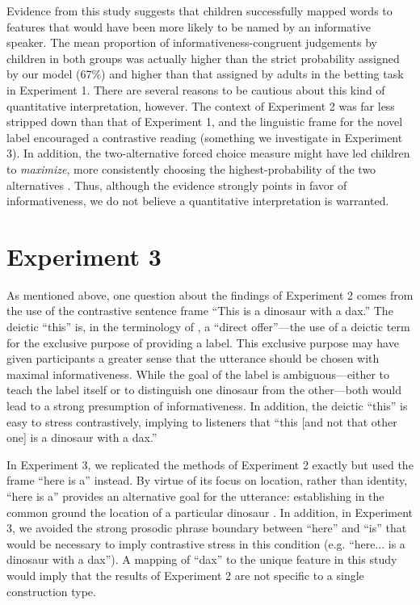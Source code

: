\documentclass[review]{elsarticle}
\begin{document}
Evidence from this study suggests that children successfully mapped words to features that would have been more likely to be named by an informative speaker. The mean proportion of informativeness-congruent judgements by children in both groups was actually higher than the strict probability assigned by our model (67\%) and higher than that assigned by adults in the betting task in Experiment 1. There are several reasons to be cautious about this kind of quantitative interpretation, however. The context of Experiment 2 was far less stripped down than that of Experiment 1, and the linguistic frame for the novel label encouraged a contrastive reading (something we investigate in Experiment 3). In addition, the two-alternative forced choice measure might have led children to \emph{maximize}, more consistently choosing the highest-probability of the two alternatives  \citep{hudsonkam2005}. Thus, although the evidence strongly points in favor of informativeness, we do not believe a quantitative interpretation is warranted.




\section{Experiment 3}

As mentioned above, one question about the findings of Experiment 2 comes from the use of the contrastive sentence frame ``This is a dinosaur with a dax.'' The deictic ``this'' is, in the terminology of \citet{clark2002}, a ``direct offer''---the use of a deictic term for the exclusive purpose of providing a label. This exclusive purpose may have given participants a greater sense that the utterance should be chosen with maximal informativeness. While the goal of the label is ambiguous---either to teach the label itself or to distinguish one dinosaur from the other---both would lead to a strong presumption of informativeness. In addition, the deictic ``this'' is easy to stress contrastively, implying to listeners that ``this [and not that other one] is a dinosaur with a dax.'' 

In Experiment 3, we replicated the methods of Experiment 2 exactly but used the frame ``here is a'' instead. By virtue of its focus on location, rather than identity, ``here is a'' provides an alternative goal for the utterance: establishing in the common ground the location of a particular dinosaur \citep{clark1996}.  In addition, in Experiment 3, we avoided the strong prosodic phrase boundary between ``here'' and ``is'' that would be necessary to imply contrastive stress in this condition (e.g. ``here... is a dinosaur with a dax''). A mapping of ``dax'' to the unique feature in this study would imply that the results of Experiment 2 are not specific to a single construction type. 
\end{document}
